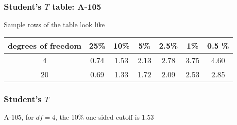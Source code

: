\documentclass[handout]{beamer}
\begin{document}

   \begin{frame} \frametitle{Student's $T$ table: A-105}

   \begin{block}
   {Sample rows of the table look like}
   \begin{tabular}{ccccccc}
   {\small degrees of freedom} & 25\% & 10\% & 5\% & 2.5\% & 1\% & 0.5 \% \\ \hline

   4 & 0.74 & 1.53 & 2.13 & 2.78 & 3.75 & 4.60 \\
   20 & 0.69 & 1.33 & 1.72 & 2.09 & 2.53 & 2.85 \\
   \end{tabular}
   \end{block}
   \end{frame}



   \begin{frame}
   \frametitle{Student's $T$}
   \begin{center}
   \end{center}
   A-105, for $df=4$, the 10\% one-sided cutoff is 1.53
   \end{frame}

\end{document}
